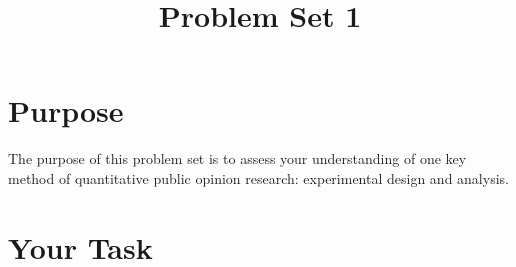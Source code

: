\documentclass[a4paper,12pt]{exam}
\title{Problem Set 1}
\author{}
\date{}
\begin{document}
\vspace{-4em}

\maketitle

\vspace{-4em}

\section{Purpose}\label{purpose}

The purpose of this problem set is to assess your understanding of one key method of quantitative public opinion research: experimental design and analysis.

\section{Your Task}\label{your-task}
\end{document}
